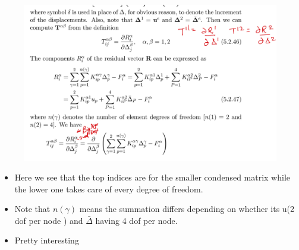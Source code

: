 	\begin{frame}
		\begin{figure}
			\centering
			\includegraphics[width=0.8\linewidth]{Figure/2}
			\label{fig:2}
		\end{figure}
		\begin{itemize}
			\item Here we see that the top indices are for the smaller condensed matrix while the lower one takes care of every degree of freedom. 
			\item Note that $n(\gamma)$ means the summation differs depending on whether its u(2 dof per node ) and $\bar{\Delta}$ having 4 dof per node. 
			\item Pretty interesting
		\end{itemize}
	\end{frame}
